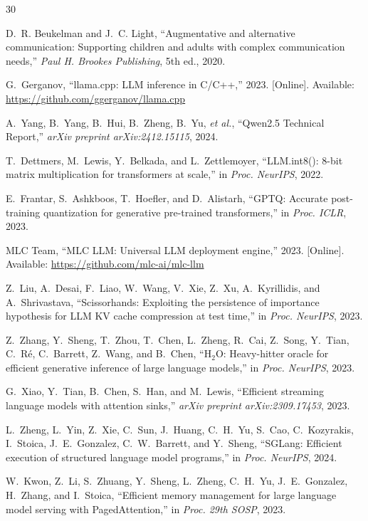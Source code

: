 \documentclass[journal]{IEEEtran}
\begin{document}
\begin{thebibliography}{30}

D.~R. Beukelman and J.~C. Light,
``Augmentative and alternative communication: Supporting children and adults with complex communication needs,''
\emph{Paul H. Brookes Publishing}, 5th ed., 2020.

G.~Gerganov,
``llama.cpp: LLM inference in {C/C++},''
2023. [Online]. Available: \url{https://github.com/ggerganov/llama.cpp}

A.~Yang, B.~Yang, B.~Hui, B.~Zheng, B.~Yu, \emph{et al.},
``{Qwen2.5 Technical Report},''
\emph{arXiv preprint arXiv:2412.15115}, 2024.

T.~Dettmers, M.~Lewis, Y.~Belkada, and L.~Zettlemoyer,
``{LLM.int8(): 8-bit matrix multiplication for transformers at scale},''
in \emph{Proc. NeurIPS}, 2022.

E.~Frantar, S.~Ashkboos, T.~Hoefler, and D.~Alistarh,
``{GPTQ: Accurate post-training quantization for generative pre-trained transformers},''
in \emph{Proc. ICLR}, 2023.

MLC Team,
``{MLC LLM}: Universal {LLM} deployment engine,''
2023. [Online]. Available: \url{https://github.com/mlc-ai/mlc-llm}

Z.~Liu, A.~Desai, F.~Liao, W.~Wang, V.~Xie, Z.~Xu, A.~Kyrillidis, and A.~Shrivastava,
``Scissorhands: Exploiting the persistence of importance hypothesis for {LLM} {KV} cache compression at test time,''
in \emph{Proc. NeurIPS}, 2023.

Z.~Zhang, Y.~Sheng, T.~Zhou, T.~Chen, L.~Zheng, R.~Cai, Z.~Song, Y.~Tian, C.~R\'{e}, C.~Barrett, Z.~Wang, and B.~Chen,
``{H$_2$O: Heavy-hitter oracle for efficient generative inference of large language models},''
in \emph{Proc. NeurIPS}, 2023.

G.~Xiao, Y.~Tian, B.~Chen, S.~Han, and M.~Lewis,
``{Efficient streaming language models with attention sinks},''
\emph{arXiv preprint arXiv:2309.17453}, 2023.

L.~Zheng, L.~Yin, Z.~Xie, C.~Sun, J.~Huang, C.~H.~Yu, S.~Cao, C.~Kozyrakis, I.~Stoica, J.~E.~Gonzalez, C.~W.~Barrett, and Y.~Sheng,
``{SGLang: Efficient execution of structured language model programs},''
in \emph{Proc. NeurIPS}, 2024.

W.~Kwon, Z.~Li, S.~Zhuang, Y.~Sheng, L.~Zheng, C.~H.~Yu, J.~E.~Gonzalez, H.~Zhang, and I.~Stoica,
``{Efficient memory management for large language model serving with PagedAttention},''
in \emph{Proc. 29th SOSP}, 2023.


\end{thebibliography}
\end{document}
